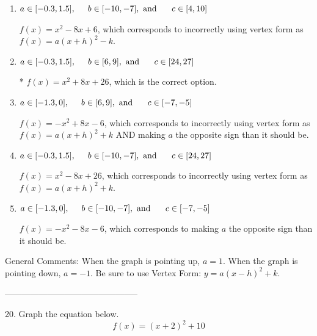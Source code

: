 \documentclass{article}[14pt]
\begin{document}
\begin{enumerate}[label=\Alph*.] 
\item $ a \in [-0.3, 1.5], \hspace*{5mm} b \in [-10, -7], \text{ and } \hspace*{5mm} c \in [4, 10] $ 

 $f(x)=x^{2} -8 x + 6$, which corresponds to incorrectly using vertex form as $f(x) = a(x+h)^2 - k$. 
\item $ a \in [-0.3, 1.5], \hspace*{5mm} b \in [6, 9], \text{ and } \hspace*{5mm} c \in [24, 27] $ 

 * $f(x)=x^{2} +8 x + 26$, which is the correct option. 
\item $ a \in [-1.3, 0], \hspace*{5mm} b \in [6, 9], \text{ and } \hspace*{5mm} c \in [-7, -5] $ 

 $f(x)=-x^{2} +8 x -6$, which corresponds to incorrectly using vertex form as $f(x) = a(x+h)^2+k$ AND making $a$ the opposite sign than it should be. 
\item $ a \in [-0.3, 1.5], \hspace*{5mm} b \in [-10, -7], \text{ and } \hspace*{5mm} c \in [24, 27] $ 

 $f(x)=x^{2} -8 x + 26$, which corresponds to incorrectly using vertex form as $f(x) = a(x+h)^2+k$. 
\item $ a \in [-1.3, 0], \hspace*{5mm} b \in [-10, -7], \text{ and } \hspace*{5mm} c \in [-7, -5] $ 

 $f(x)=-x^{2} -8 x -6$, which corresponds to making $a$ the opposite sign than it should be. 
\end{enumerate} 
 
General Comments: When the graph is pointing up, $a=1$. When the graph is pointing down, $a=-1$. Be sure to use Vertex Form: $y = a(x-h)^2+k$.

-----------------------------------------------

20. Graph the equation below.
$$ f(x) = (x+2)^2 + 10 $$ 
\end{document}
